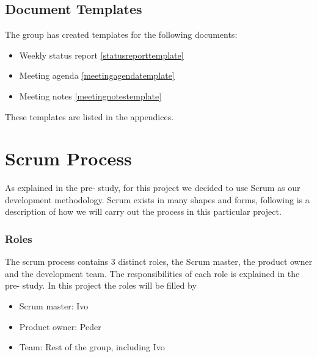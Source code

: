 \subsection{Document Templates}
The group has created templates for the following documents:

\begin{itemize}
\item Weekly status report \ref{statusreporttemplate}
\item Meeting agenda \ref{meetingagendatemplate}
\item Meeting notes \ref{meetingnotestemplate}
\end{itemize}

These templates are listed in the appendices.

\section{Scrum Process}
As explained in the pre- study, for this project we decided to use Scrum as our development methodology.  Scrum exists in many shapes and forms, following is a description of how we will carry out the process in this particular project.

\subsubsection{Roles}
The scrum process contains 3 distinct roles, the Scrum master, the product owner and the development team. The responsibilities of each role is explained in the pre- study. In this project the roles will be filled by
\begin{itemize}
\item Scrum master: Ivo
\item Product owner: Peder
\item Team: Rest of the group, including Ivo
\end{itemize}

